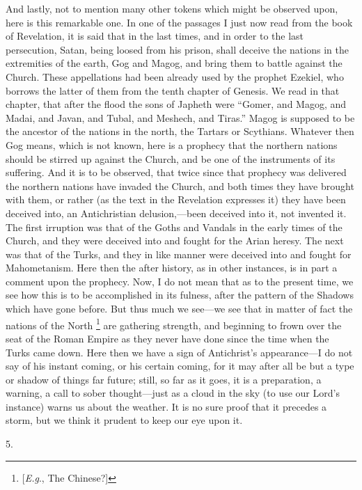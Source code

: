 And lastly, not to mention many other tokens which might be
observed upon, here is this remarkable one. In one of the passages I
just now read from the book of Revelation, it is said that in the last
times, and in order to the last persecution, Satan, being loosed from
his prison, shall deceive the nations in the extremities of the earth,
Gog and Magog, and bring them to battle against the Church. These
appellations had been already used by the prophet Ezekiel, who borrows
the latter of them from the tenth chapter of Genesis. We read in that
chapter, that after the flood the sons of Japheth were ``Gomer,
and Magog, and Madai, and Javan, and Tubal, and Meshech, and Tiras.''
Magog is supposed to be the ancestor of the nations in the north, the
Tartars or Scythians. Whatever then Gog means, which is not known,
here is a prophecy that the northern nations should be stirred up
against the Church, and be one of the instruments of its suffering.
And it is to be observed, that twice since that prophecy was delivered
the northern nations have invaded the Church, and both times they have
brought with them, or rather (as the text in the Revelation expresses
it) they have been deceived into, an Antichristian delusion,—been
deceived into it, not invented it. The first irruption was that of the
Goths and Vandals in the early times of the Church, and they were
deceived into and fought for the Arian heresy. The next was that of
the Turks, and they in like manner were deceived into and fought for
Mahometanism. Here then the after history, as in other instances, is
in part a comment upon the prophecy. Now, I do not mean that as to the
present time, we see how this is to be accomplished in its fulness,
after the pattern of the Shadows which have gone before. But thus much
we see—we see that in matter of fact the nations of the North
\footnote{[\emph{E.g}.,
The Chinese?]} are gathering strength,
and beginning to frown over the seat of the Roman Empire as they never
have done since the time when the Turks came down. Here then we have a
sign of Antichrist's appearance—I do not say of his instant coming,
or his certain coming, for it may after all be but a type or shadow of
things far future; still, so far as it goes, it is a preparation, a
warning, a call to sober thought—just as a cloud in the sky (to use
our Lord's instance) warns us about the weather. It is no sure proof
that it precedes a storm, but we think it prudent to keep our eye upon
it.

5.

